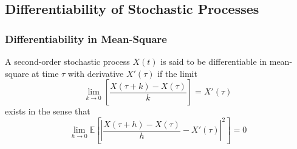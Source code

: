 \documentclass[11pt]{report} %
\begin{document}
\subsection{Differentiability of Stochastic Processes}

\subsubsection{Differentiability in Mean-Square}

A second-order stochastic process $X\left(t\right)$ is said to be differentiable in mean-square at time $\tau$ with derivative $X'\left(\tau\right)$ if the limit
\begin{equation}
\lim_{k\to 0}\left[\dfrac{X\left(\tau+k\right)-X\left(\tau\right)}{k}\right] = X'\left(\tau\right) 
\end{equation}
exists in the sense that
\begin{equation}
\lim_{h \to 0}\mathbb{E}\left[\left|\dfrac{X\left(\tau + h\right) - X\left(\tau\right)}{h} - X'\left(\tau\right)\right|^{2}\right] = 0
\end{equation}
\end{document}
